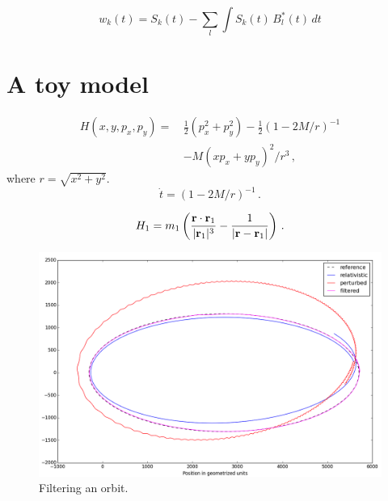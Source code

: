 \documentclass[usenatbib]{mnras}
\begin{document}
\begin{equation}
w_k(t) = S_k(t) - \sum_l \int\! S_k(t)\,B_l^*(t)\,dt
\end{equation}

\section{A toy model}

\def\half{\mbox{$\frac12$}}
\begin{equation}
\begin{aligned}
H(x, y, p_x, p_y) =\,& \half \left( p_x^2 + p_y^2 \right)
                   - \half (1-2M/r)^{-1}                   \\
                  &- M (xp_x+yp_y)^2 / r^3\,,
\end{aligned}
\end{equation}
where $r=\sqrt{x^2+y^2}$.
\begin{equation} \label{dot-t}
     \dot t = (1 - 2M/r)^{-1} \,.
\end{equation}

\begin{equation}
H_1 = m_1
  \left( \frac{{\bf r\cdot r}_1}{|{\bf r}_1|^3}
         - \frac1{|{\bf r} - {\bf r}_1|} \right)  \,.
\end{equation}

\begin{figure}
\centering
\includegraphics[height=.5\hsize]{orbits.png}
\caption{\label{fig:orbits} Filtering an orbit.}
\end{figure}
\end{document}
